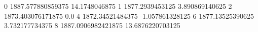 0 1887.577880859375 14.1748046875
1 1877.2939453125 3.890869140625
2 1873.403076171875 0.0
4 1872.34521484375 -1.057861328125
6 1877.13525390625 3.732177734375
8 1887.0906982421875 13.6876220703125
